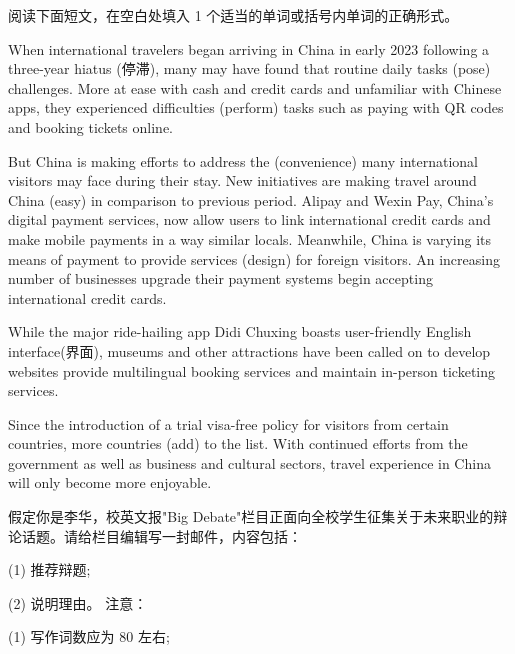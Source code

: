 \documentclass{英语试卷}
\begin{document}
\par 阅读下面短文，在空白处填入 1 个适当的单词或括号内单词的正确形式。\par
\par When international travelers began arriving in China in early 2023 following a three-year hiatus (停滞), many may have found that routine daily tasks  (pose) challenges. More at ease with cash and credit cards and unfamiliar with Chinese apps, they experienced difficulties  (perform) tasks such as paying with QR codes and booking tickets online.\par
\par But China is making efforts to address the  (convenience) many international visitors may face during their stay. New initiatives are making travel around China  (easy) in comparison to previous period. Alipay and Wexin Pay, China's digital payment services, now allow users to link international credit cards and make mobile payments in a way similar  locals. Meanwhile, China is varying its means of payment to provide services  (design) for foreign visitors. An increasing number of businesses upgrade their payment systems  begin accepting international credit cards.\par
\par While the major ride-hailing app Didi Chuxing boasts  user-friendly English interface(界面), museums and other attractions have been called on to develop websites  provide multilingual booking services and maintain in-person ticketing services.\par
\par Since the introduction of a trial visa-free policy for visitors from certain countries, more countries  (add) to the list. With continued efforts from the government as well as business and cultural sectors, travel experience in China will only become more enjoyable.\par
{}
\par 假定你是李华，校英文报"Big Debate"栏目正面向全校学生征集关于未来职业的辩论话题。请给栏目编辑写一封邮件，内容包括：\par
\par (1) 推荐辩题;\par
\par (2) 说明理由。 注意：\par
\par (1) 写作词数应为 80 左右;\par
\end{document}
